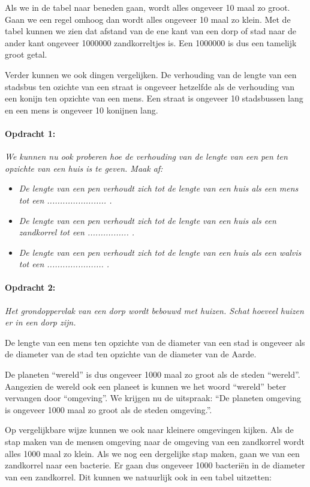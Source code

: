 Als we in de tabel naar beneden gaan, wordt alles ongeveer 10 maal
zo groot. Gaan we een regel omhoog dan wordt alles ongeveer 10 maal
zo klein. Met de tabel kunnen we zien dat afstand van de ene kant
van een dorp of stad naar de ander kant ongeveer 1000000 zandkorreltjes
is. Een 1000000 is dus een tamelijk groot getal.

Verder kunnen we ook dingen vergelijken. De verhouding van de lengte
van een stadsbus ten ozichte van een straat is ongeveer hetzelfde
als de verhouding van een konijn ten opzichte van een mens. Een straat
is ongeveer 10 stadsbussen lang en een mens is ongeveer 10 konijnen
lang.


\paragraph*{Opdracht 1:}

\emph{We kunnen nu ook proberen hoe de verhouding van de lengte van
een pen ten opzichte van een huis is te geven. Maak af:}
\begin{itemize}
\item \emph{De lengte van een pen verhoudt zich tot de lengte van een huis
als een mens tot een ....................... .}
\item \emph{De lengte van een pen verhoudt zich tot de lengte van een huis
als een zandkorrel tot een ................ .}
\item \emph{De lengte van een pen verhoudt zich tot de lengte van een huis
als een walvis tot een ...................... .}
\end{itemize}

\paragraph*{Opdracht 2:}

\emph{Het grondoppervlak van een dorp wordt bebouwd met huizen. Schat
hoeveel huizen er in een dorp zijn.}

De lengte van een mens ten opzichte van de diameter van een stad is
ongeveer als de diameter van de stad ten opzichte van de diameter
van de Aarde.

De planeten ``wereld'' is dus ongeveer 1000 maal zo groot als de
steden ``wereld''. Aangezien de wereld ook een planeet is kunnen
we het woord ``wereld'' beter vervangen door ``omgeving''. We
krijgen nu de uitspraak: ``De planeten omgeving is ongeveer 1000
maal zo groot als de steden omgeving.''.

Op vergelijkbare wijze kunnen we ook naar kleinere omgevingen kijken.
Als de stap maken van de mensen omgeving naar de omgeving van een
zandkorrel wordt alles 1000 maal zo klein. Als we nog een dergelijke
stap maken, gaan we van een zandkorrel naar een bacterie. Er gaan
dus ongeveer 1000 bacteriën in de diameter van een zandkorrel. Dit
kunnen we natuurlijk ook in een tabel uitzetten:

